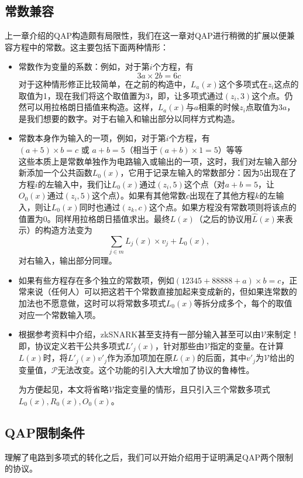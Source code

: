 \documentclass[12pt]{article}
\newcommand{\zk}{zkSNARK}
\newcommand{\pp}{$\mathcal{P}$}
\newcommand{\vv}{$\mathcal{V}$}
\begin{document}
\subsection{常数兼容}
上一章介绍的QAP构造颇有局限性，我们在这一章对QAP进行稍微的扩展以便兼容方程中的常数。这主要包括下面两种情形：
\begin{itemize}
	\item 常数作为变量的系数：例如，对于第$i$个方程，有
	         $$3a \times 2b = 6c$$
	         对于这种情形修正比较简单，在之前的构造中，$L_a(x)$这个多项式在$z_i$这点的取值为1，现在我们将这个取值置为3，即，让多项式通过$(z_i,3)$这个点。仍然可以用拉格朗日插值来构造。这样，$L_a(x)$与$a$相乘的时候$z_i$点取值为$3a$，是我们想要的数字。对于右输入和输出部分以同样方式构造。
	 \item 常数本身作为输入的一项，例如，对于第$i$个方程，有\\
	         $(a+5)\times b =c$ 或 $a+b=5$（相当于$(a+b)\times 1=5$）等等\\
	         这些本质上是常数单独作为电路输入或输出的一项，这时，我们对左输入部分新添加一个公共函数$L_0(x)$，它用于记录左输入的常数部分：因为5出现在了方程$i$的左输入中，我们让$L_0(x)$通过$(z_i,5)$这个点（对$a+b=5$，让$O_0(x)$通过$(z_i,5)$这个点）。如果有其他常数$c$出现在了其他方程$k$的左输入，则让$L_0(x)$同时也通过$(z_k,c)$这个点。如果方程没有常数项则将该点的值置为0。同样用拉格朗日插值求出。最终$L(x)$（之后的协议用$\hat{L}(x)$来表示）的构造方法变为
	         $$\sum_{j \in m} L_j(x)\times v_j+L_0(x),$$
	         对右输入，输出部分同理。
	 \item 如果有些方程存在多个独立的常数项，例如$(12345+88888+a)\times b = c $，正常来说（任何人）可以把这若干个常数直接加起来变成新的，但如果连常数的加法也不愿意做，这时可以将常数多项式$L_0(x)$等拆分成多个，每个的取值对应一个常数输入项。
	 \item 根据参考资料中介绍，\zk 甚至支持有一部分输入甚至可以由\vv 来制定！即，协议定义若干公共多项式$L'_j(x)$，针对那些由\vv 指定的变量。在计算$L(x)$时，将$L'_j(x)v'_j$作为添加项加在原$L(x)$的后面，其中$v'_j$为\vv 给出的变量值，\pp 无法改变。这个功能的引入大大增加了协议的鲁棒性。
	 
	 为方便起见，本文将省略\vv 指定变量的情形，且只引入三个常数多项式$L_0(x),R_0(x),O_0(x)$。
\end{itemize}

\subsection{QAP限制条件}
理解了电路到多项式的转化之后，我们可以开始介绍用于证明满足QAP两个限制的协议。
\end{document}
